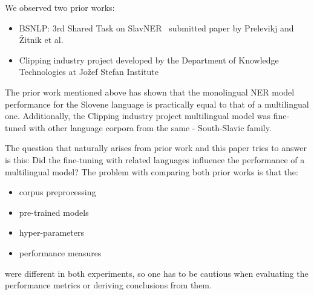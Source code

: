 \documentclass[sigconf]{acmart}
\begin{document}
We observed two prior works:
\begin{itemize}
\item BSNLP: 3rd Shared Task on SlavNER~\cite{piskorski-etal-2021-slav} submitted paper by Prelevikj and Žitnik et al.~\cite{prelevikj-zitnik-2021-multilingual}
\item Clipping industry project developed by the Department of Knowledge Technologies at Jožef Stefan Institute~\cite{KTIJS}
\end{itemize}
The prior work mentioned above has shown that the monolingual NER model performance for the Slovene language is practically equal to that of a multilingual one.
Additionally, the Clipping industry project multilingual model was fine-tuned with other language corpora from the same - South-Slavic family.

The question that naturally arises from prior work and this paper tries to answer is this: Did the fine-tuning with related languages influence the performance of a multilingual model?
The problem with comparing both prior works is that the:
\begin{itemize}
\item corpus preprocessing
\item pre-trained models
\item hyper-parameters
\item performance measures
\end{itemize}
were different in both experiments, so one has to be cautious when evaluating the performance metrics or deriving conclusions from them.
\end{document}
